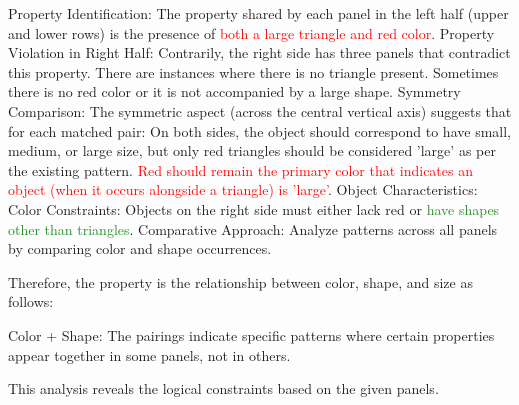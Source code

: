 \begin{tcolorbox}[breakable,enhanced jigsaw,opacityback=0,]
\begin{dialogue}
		Property Identification: The property shared by each panel in the left half (upper and lower rows) is the presence of \textcolor{red}{both a large triangle and red color}.
		Property Violation in Right Half: Contrarily, the right side has three panels that contradict this property.
		There are instances where there is no triangle present.
		Sometimes there is no red color or it is not accompanied by a large shape.
		Symmetry Comparison: The symmetric aspect (across the central vertical axis) suggests that for each matched pair:
		On both sides, the object should correspond to have small, medium, or large size, but only red triangles should be considered 'large' as per the existing pattern.
		\textcolor{red}{Red should remain the primary color that indicates an object (when it occurs alongside a triangle) is 'large'}.
		Object Characteristics:
		Color Constraints: Objects on the right side must either lack red or \textcolor{ForestGreen}{have shapes other than triangles}.
		Comparative Approach: Analyze patterns across all panels by comparing color and shape occurrences.
		
		Therefore, the property is the relationship between color, shape, and size as follows:
		
		Color + Shape: The pairings indicate specific patterns where certain properties appear together in some panels, not in others.
		
		This analysis reveals the logical constraints based on the given panels.
	\end{dialogue}
	\label{fig:task0-bongard}
\end{tcolorbox}




